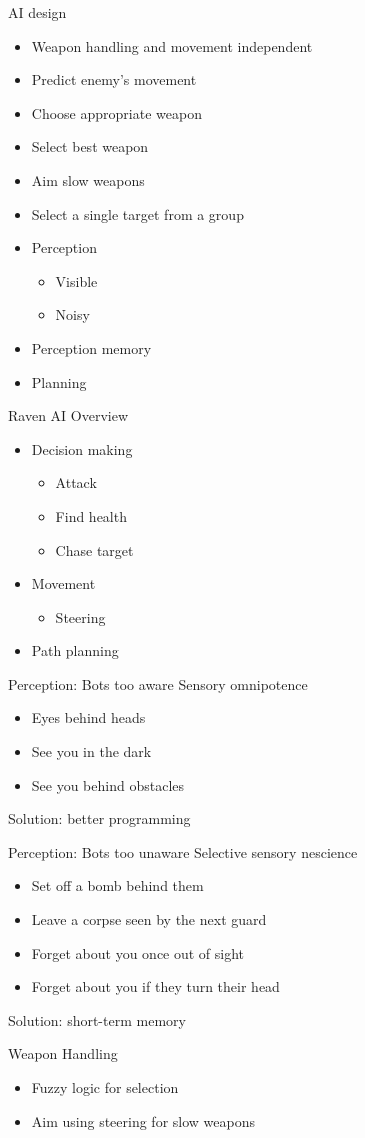 \documentclass[t,compress]{beamer}
\newcommand{\bframe}[1]{\begin{frame}[fragile]{#1}}
\newcommand{\bi}{\begin{itemize}}
\newcommand{\ei}{\end{itemize}}
\begin{document}
\bframe{AI design}
\bi
\item Weapon handling and movement independent
\item Predict enemy's movement
\item Choose appropriate weapon
\item Select best weapon
\item Aim slow weapons
\item Select a single target from a group
\item Perception
\bi \item Visible \item Noisy \ei
\item Perception memory
\item Planning
\ei
\end{frame}

\bframe{Raven AI Overview}
\bi
\item Decision making
\bi \item Attack \item Find health \item Chase target \ei
\item Movement
\bi \item Steering \ei
\item Path planning
\ei
\end{frame}

\bframe{Perception: Bots too aware}
Sensory omnipotence
\bi
\item Eyes behind heads
\item See you in the dark
\item See you behind obstacles
\ei
Solution:  better programming
\end{frame}

\bframe{Perception: Bots too unaware}
Selective sensory nescience
\bi
\item Set off a bomb behind them
\item Leave a corpse seen by the next guard
\item Forget about you once out of sight
\item Forget about you if they turn their head
\ei
Solution:  short-term memory

\end{frame}

\bframe{Weapon Handling}
\bi
\item Fuzzy logic for selection
\item Aim using steering for slow weapons
\ei

\end{frame}
\end{document}
